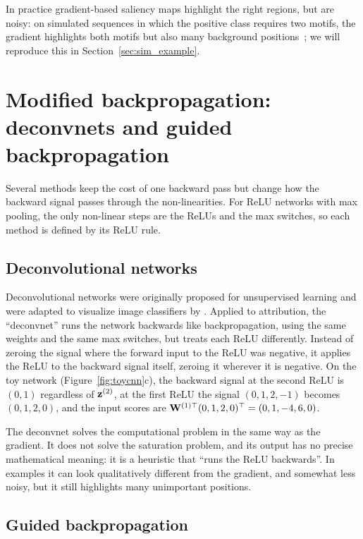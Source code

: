 In practice gradient-based saliency maps highlight the right regions, but are noisy: on simulated sequences in which the positive class requires two motifs, the gradient highlights both motifs but also many background positions~\citep{shrikumar2017}; we will reproduce this in Section~\ref{sec:sim_example}.

\section[Deconvnets and guided backpropagation]{Modified backpropagation: deconvnets and guided backpropagation}
\label{sec:modified_backprop}

Several methods keep the cost of one backward pass but change how the backward signal passes through the non-linearities. For ReLU networks with max pooling, the only non-linear steps are the ReLUs and the max switches, so each method is defined by its ReLU rule.

\subsection{Deconvolutional networks}

Deconvolutional networks were originally proposed for unsupervised learning and were adapted to visualize image classifiers by \citet{zeiler2014}. Applied to attribution, the ``deconvnet'' runs the network backwards like backpropagation, using the same weights and the same max switches, but treats each ReLU differently. Instead of zeroing the signal where the forward input to the ReLU was negative, it applies the ReLU to the backward signal itself, zeroing it wherever it is negative. On the toy network (Figure~\ref{fig:toycnn}c), the backward signal at the second ReLU is $(0,1)$ regardless of $\mathbf{z}^{(2)}$, at the first ReLU the signal $(0,1,2,-1)$ becomes $(0,1,2,0)$, and the input scores are $\mathbf{W}^{(1)\top}(0,1,2,0)^\top=(0,1,-4,6,0)$.

The deconvnet solves the computational problem in the same way as the gradient. It does not solve the saturation problem, and its output has no precise mathematical meaning: it is a heuristic that ``runs the ReLU backwards''. In examples it can look qualitatively different from the gradient, and somewhat less noisy, but it still highlights many unimportant positions.

\subsection{Guided backpropagation}

